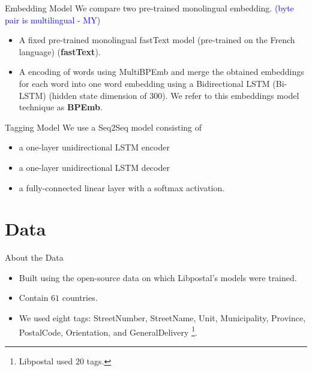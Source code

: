 \documentclass{beamer}
\newcommand{\marouane}[1]{\textcolor{blue}{(#1 - MY)}}
\begin{document}
	\begin{frame}{Embedding Model}
		We compare two pre-trained monolingual embedding. \marouane{byte pair is multilingual}
		\begin{itemize}
			\item<2-> A fixed pre-trained monolingual fastText model (pre-trained on the French language) (\textbf{fastText}).
			\item<3-> A encoding of words using MultiBPEmb and merge the obtained embeddings for each word into one word embedding using a Bidirectional LSTM (Bi-LSTM) (hidden state dimension of $300$). We refer to this embeddings model technique as \textbf{BPEmb}.
		\end{itemize}

	\end{frame}

	\begin{frame}{Tagging Model}
		We use a Seq2Seq model consisting of
		\begin{itemize}
			\item<2-> a one-layer unidirectional LSTM encoder
			\item<3-> a one-layer unidirectional LSTM decoder
			\item<4-> a fully-connected linear layer with a softmax activation. 
		\end{itemize}
		
	\end{frame}
	
	\section{Data}
	\begin{frame}{About the Data}
		\begin{itemize}
			\item<1-> Built using the open-source data on which Libpostal's models were trained.
			\item<2-> Contain $61$ countries.
			\item<2-> We used eight tags: StreetNumber, StreetName, Unit, Municipality, Province, PostalCode, Orientation, and GeneralDelivery \footnote{Libpostal used $20$ tags.}.
		\end{itemize}
	\end{frame}	
\end{document}
